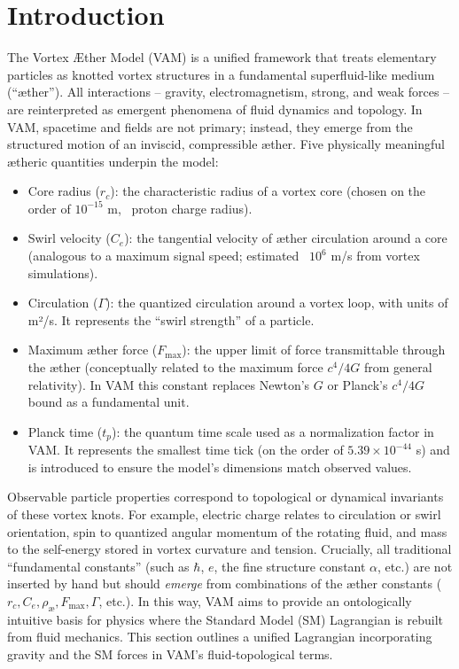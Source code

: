 \documentclass[a4paper,12pt]{article}
\begin{document}
    \newpage
    \section{Introduction}
        
        The Vortex Æther Model (VAM) is a unified framework that treats elementary particles as knotted vortex structures in a fundamental superfluid-like medium (“æther”). All interactions – gravity, electromagnetism, strong, and weak forces – are reinterpreted as emergent phenomena of fluid dynamics and topology. In VAM, spacetime and fields are not primary; instead, they emerge from the structured motion of an inviscid, compressible æther. Five physically meaningful ætheric quantities underpin the model:
        
        
        \begin{itemize}
        \item Core radius ($r_c$): the characteristic radius of a vortex core (chosen on the order of $10^{-15}$ m, ~proton charge radius).
        \item Swirl velocity ($C_e$): the tangential velocity of æther circulation around a core (analogous to a maximum signal speed; estimated ~$10^6$ m/s from vortex simulations).
        \item Circulation ($\Gamma$): the quantized circulation around a vortex loop, with units of m²/s. It represents the “swirl strength” of a particle.
        \item Maximum æther force ($F_{\max}$): the upper limit of force transmittable through the æther (conceptually related to the maximum force $c^4/4G$ from general relativity). In VAM this constant replaces Newton’s $G$ or Planck’s $c^4/4G$ bound as a fundamental unit.        
        \item Planck time ($t_p$): the quantum time scale used as a normalization factor in VAM. It represents the smallest time tick (on the order of $5.39\times10^{-44}$ s) and is introduced to ensure the model’s dimensions match observed values.        
        \end{itemize}
        
        Observable particle properties correspond to topological or dynamical invariants of these vortex knots. For example, electric charge relates to circulation or swirl orientation, spin to quantized angular momentum of the rotating fluid, and mass to the self-energy stored in vortex curvature and tension. Crucially, all traditional “fundamental constants” (such as $\hbar$, $e$, the fine structure constant $\alpha$, etc.) are not inserted by hand but should \textit{emerge} from combinations of the æther constants ($r_c, C_e, \rho_{\text{\ae}}, F_{\max}, \Gamma$, etc.). In this way, VAM aims to provide an ontologically intuitive basis for physics where the Standard Model (SM) Lagrangian is rebuilt from fluid mechanics. This section outlines a unified Lagrangian incorporating gravity and the SM forces in VAM’s fluid-topological terms.
        
\end{document}
